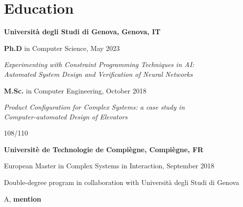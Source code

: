 \section{\sc Education}
{\bf Universit\`a degli Studi di Genova, Genova, IT}
\begin{list1}
	\item[] \textbf{Ph.D} in Computer Science, May 2023
	\item[] \textit{Experimenting with Constraint Programming Techniques
		in AI:\\Automated System Design and Verification of Neural Networks}
\end{list1}
\begin{list1}
\item[] \textbf{M.Sc.} in Computer Engineering, October 2018
\item[] \textit{Product Configuration for Complex Systems: a case study
	in\\Computer-automated Design of Elevators}
\item[] 108/110
\end{list1}

{\bf Universit\`e de Technologie de Compi\`egne, Compi\`egne, FR}
\begin{list1}
	\item[] European Master in Complex Systems in Interaction, September 2018
	\item[] Double-degree program in collaboration with Universit\`a 
	degli Studi di Genova
	\item[] A, \textbf{mention}
\end{list1}
%
